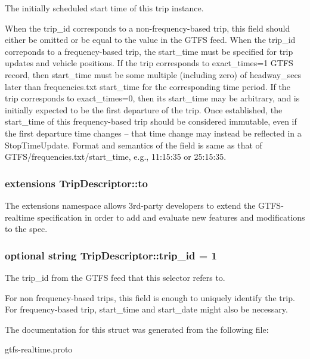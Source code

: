 The initially scheduled start time of this trip instance. 

When the trip\+\_\+id corresponds to a non-\/frequency-\/based trip, this field should either be omitted or be equal to the value in the G\+T\+FS feed. When the trip\+\_\+id correponds to a frequency-\/based trip, the start\+\_\+time must be specified for trip updates and vehicle positions. If the trip corresponds to exact\+\_\+times=1 G\+T\+FS record, then start\+\_\+time must be some multiple (including zero) of headway\+\_\+secs later than frequencies.\+txt start\+\_\+time for the corresponding time period. If the trip corresponds to exact\+\_\+times=0, then its start\+\_\+time may be arbitrary, and is initially expected to be the first departure of the trip. Once established, the start\+\_\+time of this frequency-\/based trip should be considered immutable, even if the first departure time changes -- that time change may instead be reflected in a Stop\+Time\+Update. Format and semantics of the field is same as that of G\+T\+F\+S/frequencies.\+txt/start\+\_\+time, e.\+g., 11\+:15\+:35 or 25\+:15\+:35. 
\subsubsection[{\texorpdfstring{to}{to}}]{\setlength{\rightskip}{0pt plus 5cm}extensions Trip\+Descriptor\+::to}\hypertarget{structTripDescriptor_a1c2d7a6af17cb6ebf909b087bc2af535}{}\label{structTripDescriptor_a1c2d7a6af17cb6ebf909b087bc2af535}


The extensions namespace allows 3rd-\/party developers to extend the G\+T\+F\+S-\/realtime specification in order to add and evaluate new features and modifications to the spec. 

\subsubsection[{\texorpdfstring{trip\+\_\+id}{trip_id}}]{\setlength{\rightskip}{0pt plus 5cm}optional string Trip\+Descriptor\+::trip\+\_\+id = 1}\hypertarget{structTripDescriptor_a6939be856ffede4c8b9e54b8f7a4d311}{}\label{structTripDescriptor_a6939be856ffede4c8b9e54b8f7a4d311}


The trip\+\_\+id from the G\+T\+FS feed that this selector refers to. 

For non frequency-\/based trips, this field is enough to uniquely identify the trip. For frequency-\/based trip, start\+\_\+time and start\+\_\+date might also be necessary. 

The documentation for this struct was generated from the following file\+:\begin{DoxyCompactItemize}
\item 
gtfs-\/realtime.\+proto\end{DoxyCompactItemize}
